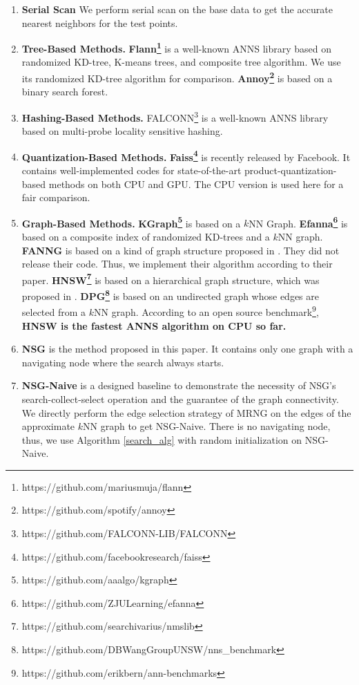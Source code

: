 \documentclass{vldb}
\begin{document}
\begin{enumerate}
\setlength{\itemsep}{1pt}
\setlength{\parskip}{0pt}
\setlength{\parsep}{0pt}
\item \textbf{Serial Scan} We perform serial scan on the base data to get the accurate nearest neighbors for the test points. 
\item \textbf{Tree-Based Methods.} \textbf{Flann\footnote{https://github.com/mariusmuja/flann}} is a well-known ANNS library based on randomized KD-tree, K-means trees, and composite tree algorithm. We use its randomized KD-tree algorithm for comparison. \textbf{Annoy\footnote{https://github.com/spotify/annoy}} is based on a binary search forest.
\item \textbf{Hashing-Based Methods.} FALCONN\footnote{https://github.com/FALCONN-LIB/FALCONN} is a well-known ANNS library based on multi-probe locality sensitive hashing.

\item \textbf{Quantization-Based Methods.} \textbf{Faiss\footnote{https://github.com/facebookresearch/faiss}} is recently released by Facebook. It contains well-implemented codes for state-of-the-art product-quantization-based methods on both CPU and GPU. The CPU version is used here for a fair comparison.

\item \textbf{Graph-Based Methods.} \textbf{KGraph\footnote{https://github.com/aaalgo/kgraph}} is based on a $k$NN Graph. \textbf{Efanna\footnote{https://github.com/ZJULearning/efanna}} is based on a composite index of randomized KD-trees and a $k$NN graph. \textbf{FANNG} is based on a kind of graph structure proposed in \cite{Ben2016Fanng}. They did not release their code. Thus, we implement their algorithm according to their paper. \textbf{HNSW\footnote{https://github.com/searchivarius/nmslib}} is based on a hierarchical graph structure, which was proposed in \cite{MalkovYHNSW16}. \textbf{DPG\footnote{https://github.com/DBWangGroupUNSW/nns\_benchmark}} is based on an undirected graph whose edges are selected from a $k$NN graph. According to an open source benchmark\footnote{https://github.com/erikbern/ann-benchmarks}, \textbf{HNSW is the fastest ANNS algorithm on CPU so far.}

\item \textbf{NSG} is the method proposed in this paper. It contains only one graph with a navigating node where the search always starts. 
\item \textbf{NSG-Naive} is a designed baseline to demonstrate the necessity of NSG's search-collect-select operation and the guarantee of the graph connectivity. We directly perform the edge selection strategy of MRNG on the edges of the approximate $k$NN graph to get NSG-Naive. There is no navigating node, thus, we use Algorithm \ref{search_alg} with random initialization on NSG-Naive. 
\end{enumerate}
\end{document}
